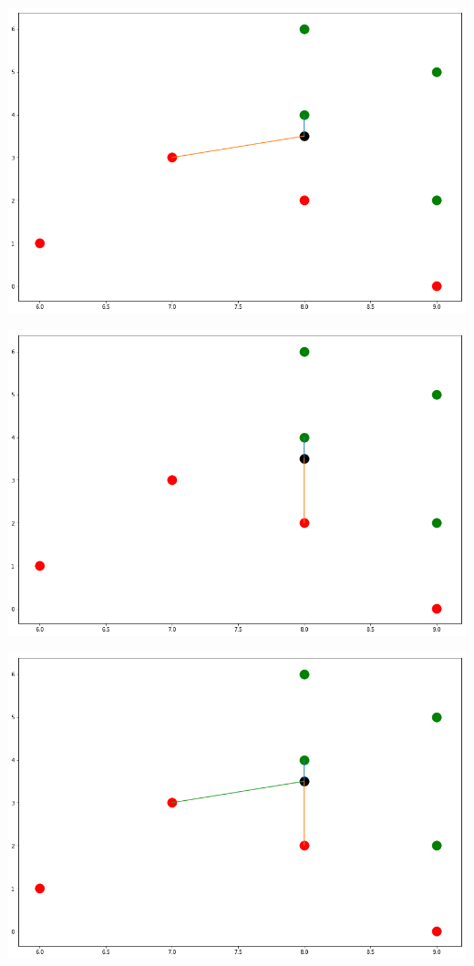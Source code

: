 \documentclass[a4paper]{scrartcl}
\begin{document}
\begin{multicols}{2}
                \includegraphics[width=\linewidth]{knn2_b.png}
                        
                \includegraphics[width=\linewidth]{knn3.png}
                        
                \includegraphics[width=\linewidth]{knn4.png}
                        

\end{multicols}
\end{document}
